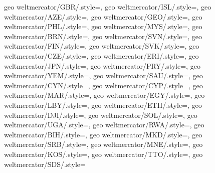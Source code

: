 {  geo weltmercator/GBR/.style={},
  geo weltmercator/ISL/.style={},
  geo weltmercator/AZE/.style={},
  geo weltmercator/GEO/.style={},
  geo weltmercator/PHL/.style={},
  geo weltmercator/MYS/.style={},
  geo weltmercator/BRN/.style={},
  geo weltmercator/SVN/.style={},
  geo weltmercator/FIN/.style={},
  geo weltmercator/SVK/.style={},
  geo weltmercator/CZE/.style={},
  geo weltmercator/ERI/.style={},
  geo weltmercator/JPN/.style={},
  geo weltmercator/PRY/.style={},
  geo weltmercator/YEM/.style={},
  geo weltmercator/SAU/.style={},
  geo weltmercator/CYN/.style={},
  geo weltmercator/CYP/.style={},
  geo weltmercator/MAR/.style={},
  geo weltmercator/EGY/.style={},
  geo weltmercator/LBY/.style={},
  geo weltmercator/ETH/.style={},
  geo weltmercator/DJI/.style={},
  geo weltmercator/SOL/.style={},
  geo weltmercator/UGA/.style={},
  geo weltmercator/RWA/.style={},
  geo weltmercator/BIH/.style={},
  geo weltmercator/MKD/.style={},
  geo weltmercator/SRB/.style={},
  geo weltmercator/MNE/.style={},
  geo weltmercator/KOS/.style={},
  geo weltmercator/TTO/.style={},
  geo weltmercator/SDS/.style={}}
